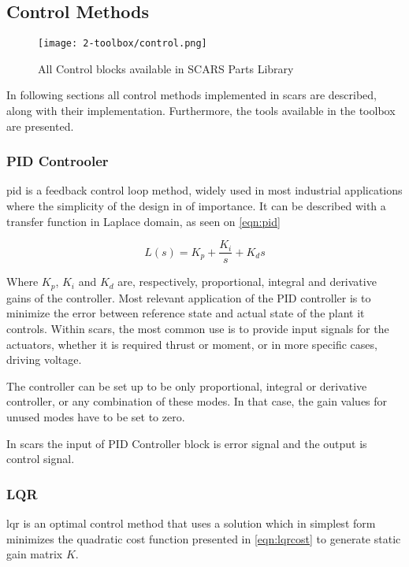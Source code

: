 \clearpage
\subsection{Control Methods}\label{sec:control}
    \begin{figure}[H]
        \centering
        \texttt{[image: 2-toolbox/control.png]}
        \caption{All Control blocks available in SCARS Parts Library}
        \label{fig:control}
    \end{figure}
    In following sections all control methods implemented in \ac{scars} are described, along with their implementation. Furthermore, the tools available in the toolbox are presented. 
    
    \subsubsection{PID Controoler}

        \ac{pid} is a feedback control loop method, widely used in most industrial applications where the simplicity of the design in of importance. It can be described with a transfer function in Laplace domain, as seen on \autoref{eqn:pid}
        
        \begin{equation}
            L(s) = K_p + \frac{K_i}{s} + K_d s
        \end{equation}\label{eqn:pid}

        Where $K_p$, $K_i$ and $K_d$ are, respectively, proportional, integral and derivative gains of the controller. Most relevant application of the PID controller is to minimize the error between reference state and actual state of the plant it controls. Within \ac{scars}, the most common use is to provide input signals for the actuators, whether it is required thrust or moment, or in more specific cases, driving voltage.

        The controller can be set up to be only proportional, integral or derivative controller, or any combination of these modes. In that case, the gain values for unused modes have to be set to zero.

        In \ac{scars} the input of PID Controller block is error signal and the output is control signal.  
    
    \subsubsection{LQR}\label{sec:lqr}
        \ac{lqr} is an optimal control method that uses a solution which in simplest form minimizes the quadratic cost function presented in \autoref{eqn:lqrcost} to generate static gain matrix $K$.


